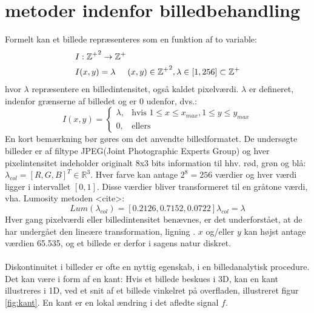 \section{metoder indenfor billedbehandling}\label{subsec:kant}
Formelt kan et billede repræsenteres som en funktion af to variable:
\begin{equation}
\begin{split}
&I: \mathbb{\mathbb{Z^+}}^2 \rightarrow \mathbb{Z^+} \\
&I(x,y) = \lambda \hspace{0.5 cm} (x,y)\in \mathbb{Z^+}^2, \lambda \in [1,256] \subset \mathbb{Z^+}
\end{split}
\end{equation}
hvor $\lambda$ repræsentere en billedintensitet, også kaldet pixelværdi. $\lambda$ er defineret, indenfor grænserne af billedet og er 0 udenfor, dvs.: 
\begin{equation}
 I(x, y) =
\begin{cases}
    \lambda, & \text{hvis } 1 \leq x \leq x_{max}, 1 \leq y \leq y_{max} \\
    0,              & \text{ellers}
    \label{pixelintensitet}
\end{cases}
\end{equation}
En kort bemærkning bør gøres om det anvendte billedformatet. De undersøgte billeder er af filtype JPEG(Joint Photographic Experts Group) og hver pixelintensitet indeholder originalt 8x3 bits information til hhv. rød, grøn og blå: $\lambda_{col} = [R,G,B]^T \in \mathbb{R}^3$. Hver farve kan antage $2^8 = 256$ værdier og hver værdi ligger i intervallet $[0,1]$. Disse værdier bliver transformeret til en gråtone værdi, vha. Lumosity metoden <cite>:
\begin{equation}
Lum(\lambda_{col}) = [0.2126, 0.7152, 0.0722] \lambda_{col} = \lambda
\label{lumosity}
\end{equation}
Hver gang pixelværdi eller billedintensitet benævnes, er det underforstået, at de har undergået den lineære transformation, ligning \cite{lumosity}. $x$ og/eller $y$ kan højst antage værdien 65.535, og et billede er derfor i sagens natur diskret.
\\
\\
Diskontinuitet i billeder er ofte en nyttig egenskab, i en billedanalytisk procedure. Det kan være i form af en kant: Hvis et billede beskues i 3D, kan en kant illustreres i 1D, ved et snit af et billede vinkelret på overfladen, illustreret figur \ref{fig:kant}. En kant er en lokal ændring i det afledte signal $f$.
